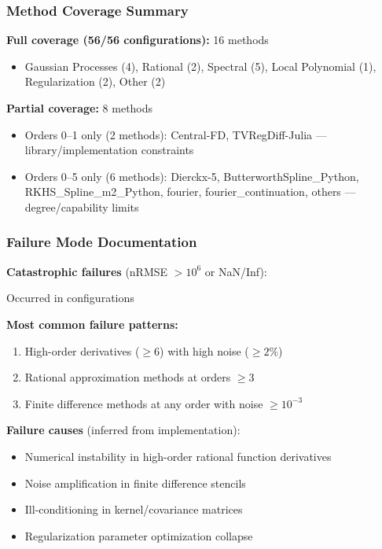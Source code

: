 \subsubsection{Method Coverage Summary}

\textbf{Full coverage (56/56 configurations):} 16 methods
\begin{itemize}
    \item Gaussian Processes (4), Rational (2), Spectral (5), Local Polynomial (1), Regularization (2), Other (2)
\end{itemize}

\textbf{Partial coverage:} 8 methods
\begin{itemize}
    \item Orders 0--1 only (2 methods): Central-FD, TVRegDiff-Julia --- library/implementation constraints
    \item Orders 0--5 only (6 methods): Dierckx-5, ButterworthSpline\_Python, RKHS\_Spline\_m2\_Python, fourier, fourier\_continuation, others --- degree/capability limits
\end{itemize}

\subsubsection{Failure Mode Documentation}

\textbf{Catastrophic failures} (nRMSE $> 10^6$ or NaN/Inf):

Occurred in  configurations

\textbf{Most common failure patterns:}
\begin{enumerate}
    \item High-order derivatives ($\geq 6$) with high noise ($\geq 2\%$)
    \item Rational approximation methods at orders $\geq 3$
    \item Finite difference methods at any order with noise $\geq 10^{-3}$
\end{enumerate}

\textbf{Failure causes} (inferred from implementation):
\begin{itemize}
    \item Numerical instability in high-order rational function derivatives
    \item Noise amplification in finite difference stencils
    \item Ill-conditioning in kernel/covariance matrices
    \item Regularization parameter optimization collapse
\end{itemize}

